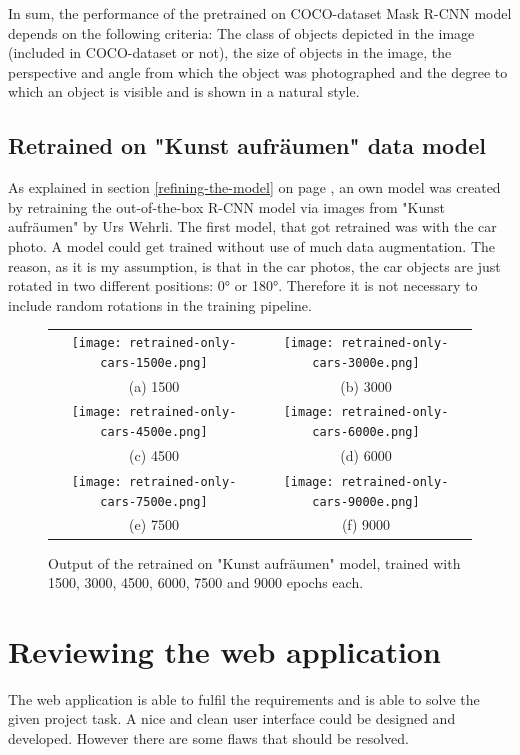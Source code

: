 In sum, the performance of the pretrained on COCO-dataset Mask R-CNN model depends on the following criteria: The class of objects depicted in the image (included in COCO-dataset or not), the size of objects in the image, the perspective and angle from which the object was photographed and the degree to which an object is visible and is shown in a natural style.

\subsection{Retrained on "Kunst aufräumen" data model}

As explained in section \ref{refining-the-model} on page \pageref{refining-the-model}, an own model was created by retraining the out-of-the-box R-CNN model via images from "Kunst aufräumen" by Urs Wehrli. The first model, that got retrained was with the car photo. A model could get trained without use of much data augmentation. The reason, as it is my assumption, is that in the car photos, the car objects are just rotated in two different positions: 0° or 180°. Therefore it is not necessary to include random rotations in the training pipeline.

\begin{figure}[H]
\begin{tabular}{cc}
 \texttt{[image: retrained-only-cars-1500e.png]} &   \texttt{[image: retrained-only-cars-3000e.png]} \\
 (a) 1500 & (b) 3000 \\[6pt]
 \texttt{[image: retrained-only-cars-4500e.png]} &   \texttt{[image: retrained-only-cars-6000e.png]} \\
(c) 4500 & (d) 6000 \\[6pt]
 \texttt{[image: retrained-only-cars-7500e.png]} &   \texttt{[image: retrained-only-cars-9000e.png]} \\
(e) 7500 & (f) 9000 \\[6pt]
\end{tabular}
\caption{Output of the retrained on "Kunst aufräumen" model, trained with 1500, 3000, 4500, 6000, 7500 and 9000 epochs each.}
\label{fig:epochs-output}
\end{figure}

\section{Reviewing the web application}

The web application is able to fulfil the requirements and is able to solve the given project task. A nice and clean user interface could be designed and developed. However there are some flaws that should be resolved.

